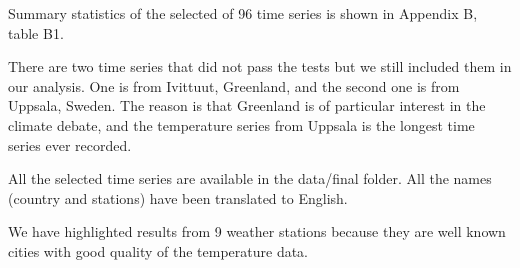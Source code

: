 \documentclass[]{article}
\begin{document}
Summary statistics of the selected of 96 time series is shown in
Appendix B, table B1.

There are two time series that did not pass the tests but we still
included them in our analysis. One is from Ivittuut, Greenland, and the
second one is from Uppsala, Sweden. The reason is that Greenland is of
particular interest in the climate debate, and the temperature series
from Uppsala is the longest time series ever recorded.

All the selected time series are available in the data/final folder. All
the names (country and stations) have been translated to English.

We have highlighted results from 9 weather stations because they are
well known cities with good quality of the temperature data.
\end{document}
